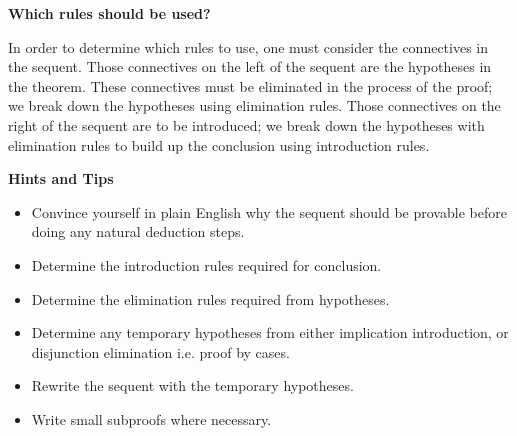 \documentclass[11pt]{report}
\begin{document}
\textbf{Which rules should be used?}

In order to determine which rules to use, one must consider the connectives in the sequent. Those connectives on the left of the sequent are the hypotheses in the theorem. These connectives must be eliminated in the process of the proof; we break down the hypotheses using elimination rules. Those connectives on the right of the sequent are to be introduced; we break down the hypotheses with elimination rules to build up the conclusion using introduction rules. 

\textbf{Hints and Tips}

\begin{itemize}
	\item[] Convince yourself in plain English why the sequent should be provable before doing any natural deduction steps.
	\item[] Determine the introduction rules required for conclusion. 
	\item[] Determine the elimination rules required from hypotheses.
	\item[] Determine any temporary hypotheses from either implication introduction, or disjunction elimination i.e. proof by cases. 
	\item[] Rewrite the sequent with the temporary hypotheses. 
	\item[] Write small subproofs where necessary. 
\end{itemize}
\end{document}
